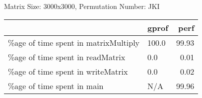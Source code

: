 \documentclass{article}
\begin{document}
    Matrix Size: 3000x3000, Permutation Number: JKI \\
    \begin{tabular}{llr}
\hline
                                      & gprof   &   perf \\
\hline
 \%age of time spent in matrixMultiply & 100.0   &  99.93 \\
 \%age of time spent in readMatrix     & 0.0     &   0.01 \\
 \%age of time spent in writeMatrix    & 0.0     &   0.02 \\
 \%age of time spent in main           & N/A     &  99.96 \\
\hline
\end{tabular}
    
\end{document}
